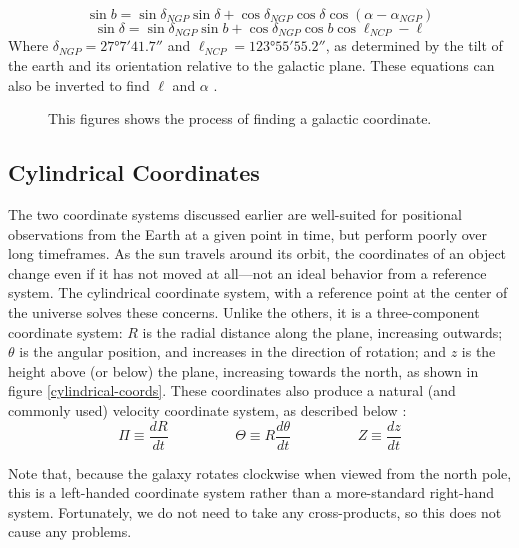 \documentclass[12pt,twoside]{reedthesis}
\begin{document}
\begin{equation}
    \sin b = \sin \delta_{NGP} \sin \delta + \cos \delta_{NGP} \cos \delta \cos (\alpha-\alpha_{NGP})
\end{equation}
\begin{equation}
    \sin \delta = \sin \delta_{NGP} \sin b + \cos \delta_{NGP} \cos b \cos{\ell_{NCP} - \ell}
\end{equation}
Where $\delta_{NGP} = \ang{27;7;41.7}$ and $\ell_{NCP}=\ang{123;55;55.2}$, as determined by the tilt of the earth and its orientation relative to the galactic plane. These equations can also be inverted to find $\ell$ and $\alpha$ \citep[pp. 900]{modern-astrophysics}.

\begin{figure}[p]
    \caption{This figures shows the process of finding a galactic coordinate.}
    \label{galactic-coords}
\end{figure}

\subsection*{Cylindrical Coordinates}

The two coordinate systems discussed earlier are well-suited for positional observations from the Earth at a given point in time, but perform poorly over long timeframes. As the sun travels around its orbit, the coordinates of an object change even if it has not moved at all---not an ideal behavior from a reference system. The cylindrical coordinate system, with a reference point at the center of the universe solves these concerns. Unlike the others, it is a three-component coordinate system: $R$ is the radial distance along the plane, increasing outwards; $\theta$ is the angular position, and increases in the direction of rotation; and $z$ is the height above (or below) the plane, increasing towards the north, as shown in figure \ref{cylindrical-coords}. These coordinates also produce a natural (and commonly used) velocity coordinate system, as described below \citep{modern-astrophysics}:
\begin{equation}
    \Pi \equiv \frac{dR}{dt} \hspace{2cm} \Theta \equiv R\frac{d\theta}{dt} \hspace{2cm} Z \equiv \frac{dz}{dt}
\end{equation}

Note that, because the galaxy rotates clockwise when viewed from the north pole, this is a left-handed coordinate system rather than a more-standard right-hand system. Fortunately, we do not need to take any cross-products, so this does not cause any problems.
\end{document}
